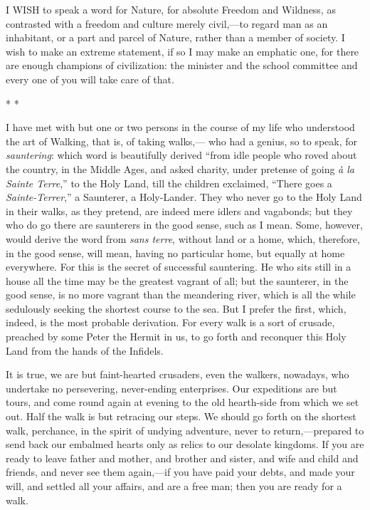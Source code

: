 \documentclass[twoside,openright,10pt]{memoir} %
\begin{document}
\SingleSpacing
I WISH to speak a word for Nature, for absolute Freedom and Wildness, as contrasted with a freedom and culture merely civil,—to regard man as an inhabitant, or a part and parcel of Nature, rather than a member of society. I wish to make an extreme statement, if so I may make an emphatic one, for there are enough champions of civilization: the minister and the school committee and every one of you will take care of that.
\begin{center}\tiny * * * \normalsize \end{center}
I have met with but one or two persons in the course of my life who understood the art of Walking, that is, of taking walks,— who had a genius, so to speak, for \emph{sauntering}: which word is beautifully derived “from idle people who roved about the country, in the Middle Ages, and asked charity, under pretense of going \emph{à la Sainte Terre},” to the Holy Land, till the children exclaimed, “There goes a \emph{Sainte-Terrer},” a Saunterer, a Holy-Lander. They who never go to the Holy Land in their walks, as they pretend, are indeed mere idlers and vagabonds; but they who do go there are saunterers in the good sense, such as I mean. Some, however, would derive the word from \emph{sans terre}, without land or a home, which, therefore, in the good sense, will mean, having no particular home, but equally at home everywhere. For this is the secret of successful sauntering. He who sits still in a house all the time may be the greatest vagrant of all; but the saunterer, in the good sense, is no more vagrant than the meandering river, which is all the while sedulously seeking the shortest course to the sea. But I prefer the first, which, indeed, is the most probable derivation. For every walk is a sort of crusade, preached by some Peter the Hermit in us, to go forth and reconquer this Holy Land from the hands of the Infidels.

It is true, we are but faint-hearted crusaders, even the walkers, nowadays, who undertake no persevering, never-ending enterprises. Our expeditions are but tours, and come round again at evening to the old hearth-side from which we set out. Half the walk is but retracing our steps. We should go forth on the shortest walk, perchance, in the spirit of undying adventure, never to return,—prepared to send back our embalmed hearts only as relics to our desolate kingdoms. If you are ready to leave father and mother, and brother and sister, and wife and child and friends, and never see them again,—if you have paid your debts, and made your will, and settled all your affairs, and are a free man; then you are ready for a walk.
\end{document}
